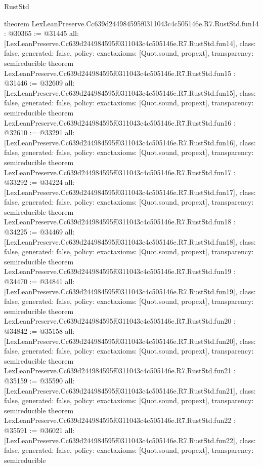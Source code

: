 \begin{lexlean}{RustStd}
\begin{coremodule}
{}
theorem LexLeanPreserve.Cc639d244984595f0311043c4c505146e.R7.RustStd.fun14 : @30365 := @31445 {
  all: [LexLeanPreserve.Cc639d244984595f0311043c4c505146e.R7.RustStd.fun14],
  class: false,
  generated: false,
  policy: exact{axioms: [Quot.sound, propext]},
  transparency: semireducible
}
theorem LexLeanPreserve.Cc639d244984595f0311043c4c505146e.R7.RustStd.fun15 : @31446 := @32609 {
  all: [LexLeanPreserve.Cc639d244984595f0311043c4c505146e.R7.RustStd.fun15],
  class: false,
  generated: false,
  policy: exact{axioms: [Quot.sound, propext]},
  transparency: semireducible
}
theorem LexLeanPreserve.Cc639d244984595f0311043c4c505146e.R7.RustStd.fun16 : @32610 := @33291 {
  all: [LexLeanPreserve.Cc639d244984595f0311043c4c505146e.R7.RustStd.fun16],
  class: false,
  generated: false,
  policy: exact{axioms: [Quot.sound, propext]},
  transparency: semireducible
}
theorem LexLeanPreserve.Cc639d244984595f0311043c4c505146e.R7.RustStd.fun17 : @33292 := @34224 {
  all: [LexLeanPreserve.Cc639d244984595f0311043c4c505146e.R7.RustStd.fun17],
  class: false,
  generated: false,
  policy: exact{axioms: [Quot.sound, propext]},
  transparency: semireducible
}
theorem LexLeanPreserve.Cc639d244984595f0311043c4c505146e.R7.RustStd.fun18 : @34225 := @34469 {
  all: [LexLeanPreserve.Cc639d244984595f0311043c4c505146e.R7.RustStd.fun18],
  class: false,
  generated: false,
  policy: exact{axioms: [Quot.sound, propext]},
  transparency: semireducible
}
theorem LexLeanPreserve.Cc639d244984595f0311043c4c505146e.R7.RustStd.fun19 : @34470 := @34841 {
  all: [LexLeanPreserve.Cc639d244984595f0311043c4c505146e.R7.RustStd.fun19],
  class: false,
  generated: false,
  policy: exact{axioms: [Quot.sound, propext]},
  transparency: semireducible
}
theorem LexLeanPreserve.Cc639d244984595f0311043c4c505146e.R7.RustStd.fun20 : @34842 := @35158 {
  all: [LexLeanPreserve.Cc639d244984595f0311043c4c505146e.R7.RustStd.fun20],
  class: false,
  generated: false,
  policy: exact{axioms: [Quot.sound, propext]},
  transparency: semireducible
}
theorem LexLeanPreserve.Cc639d244984595f0311043c4c505146e.R7.RustStd.fun21 : @35159 := @35590 {
  all: [LexLeanPreserve.Cc639d244984595f0311043c4c505146e.R7.RustStd.fun21],
  class: false,
  generated: false,
  policy: exact{axioms: [Quot.sound, propext]},
  transparency: semireducible
}
theorem LexLeanPreserve.Cc639d244984595f0311043c4c505146e.R7.RustStd.fun22 : @35591 := @36021 {
  all: [LexLeanPreserve.Cc639d244984595f0311043c4c505146e.R7.RustStd.fun22],
  class: false,
  generated: false,
  policy: exact{axioms: [Quot.sound, propext]},
  transparency: semireducible
}
\end{coremodule}
\end{lexlean}
